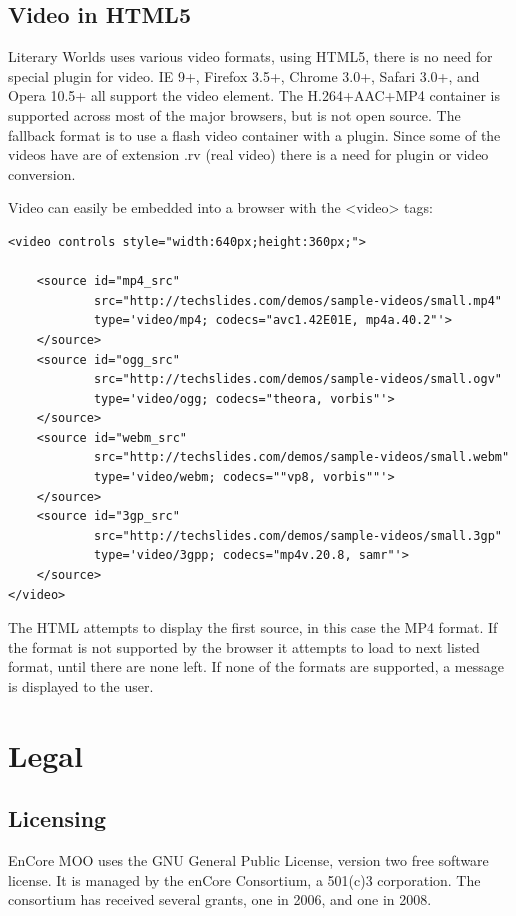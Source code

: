 \documentclass[12pt, letterpaper]{report}
\begin{document}
\section{Video in HTML5}
\par
Literary Worlds uses various video formats, using HTML5, there is no need for special plugin for video.  IE 9+, Firefox 3.5+, Chrome 3.0+, Safari 3.0+, and Opera 10.5+ all support the video element. The H.264+AAC+MP4 container is supported across most of the major browsers, but is not open source.  The fallback format is to use a flash video container with a plugin.  Since some of the videos have are of extension .rv (real video) there is a need for plugin or video conversion.

\par
Video can easily be embedded into a browser with the <video> tags:
\begin{lstlisting}
<video controls style="width:640px;height:360px;">
	
	<source id="mp4_src"
			src="http://techslides.com/demos/sample-videos/small.mp4"
			type='video/mp4; codecs="avc1.42E01E, mp4a.40.2"'>
	</source>
	<source id="ogg_src"
			src="http://techslides.com/demos/sample-videos/small.ogv"
			type='video/ogg; codecs="theora, vorbis"'>
	</source>
	<source id="webm_src"
			src="http://techslides.com/demos/sample-videos/small.webm"
			type='video/webm; codecs=""vp8, vorbis""'>
	</source>
	<source id="3gp_src"
			src="http://techslides.com/demos/sample-videos/small.3gp"
			type='video/3gpp; codecs="mp4v.20.8, samr"'>
	</source>
</video>
\end{lstlisting}

\par
The HTML attempts to display the first source, in this case the MP4 format.  If the format is not supported by the browser it attempts to load to next listed format, until there are none left.  If none of the formats are supported, a message is displayed to the user.

\chapter{Legal}
\section{Licensing}
\par
EnCore MOO uses the GNU General Public License, version two free software license. It is managed by the enCore Consortium, a 501(c)3 corporation. The consortium has received several grants, one in 2006, and one in 2008.
\end{document}
